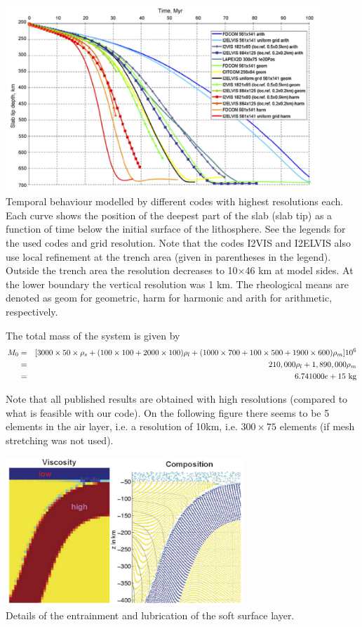 \begin{center}
\includegraphics[height=7cm]{python_codes/fieldstone_67/images/scbe08e}\\
{\captionfont 
Temporal behaviour modelled by different codes with highest resolutions each. 
Each curve shows the position of the deepest part of the slab (slab tip) as
a function of time below the initial surface of the lithosphere. 
See the legends for the used codes and grid resolution. 
Note that the codes I2VIS and I2ELVIS also use local
refinement at the trench area (given in parentheses in the legend). 
Outside the trench area the resolution decreases to 10$\times$46 km at model sides. 
At the lower boundary the vertical resolution was 1 km. 
The rheological means are denoted as geom for geometric, harm for harmonic 
and arith for arithmetic, respectively. }
\end{center}

The total mass of the system is given by
\begin{eqnarray}
M_0 &=& [3000\times 50\times \rho_s + (100\times 100+ 2000\times 100)\rho_l + 
(1000\times 700 + 100\times 500 + 1900\times 600)\rho_m] 10^6\nn\\
&=&210,000 \rho_l + 1,890,000 \rho_m \nn\\
&=&6.741000e+15~\si{\kg}
\end{eqnarray}

Note that all published results are obtained with high resolutions (compared to what is 
feasible with our code). On the following figure there seems to be 5 elements in the air layer, 
i.e. a resolution of 10km, i.e. $300\times 75$ elements (if mesh stretching was not used).
\begin{center}
\includegraphics[width=9cm]{python_codes/fieldstone_67/images/scbe08f}\\
{\captionfont Details of the entrainment and lubrication of the soft surface layer.}
\end{center}

